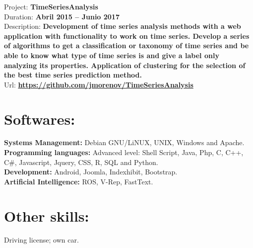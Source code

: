 \documentclass	[10pt,a4paper,oneside]{article}
\newcommand{\seccion}[1]{\vspace*{3mm}\section*{#1}\vspace*{-3mm}}
\begin{document}
Project: \textbf{TimeSeriesAnalysis}\\
Duration: \textbf{Abril 2015 – Junio 2017}\\
Description: \textbf{Development of time series analysis methods with a web application with functionality to work on time series. Develop a series of algorithms to get a classification or taxonomy of time series and be able to know what type of time series is and give a label only analyzing its properties. Application of clustering for the selection of the best time series prediction method.}\\
Url: \textbf{\url{https://github.com/jmorenov/TimeSeriesAnalysis}}


\seccion{Softwares:}
\textbf{Systems Management:} Debian GNU/LiNUX, UNIX, Windows and Apache.\\
\textbf{Programming languages:} Advanced level: Shell Script, Java, Php, C,
C++, C\#, Javascript, Jquery, CSS, R, SQL and Python.\\
\textbf{Development:} Android, Joomla, Indexhibit, Bootstrap.\\
\textbf{Artificial Intelligence:} ROS, V-Rep, FastText.


\seccion{Other skills:}
Driving license; own car.\\
\end{document}
